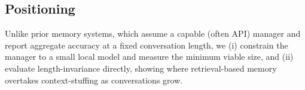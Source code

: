 \subsection{Positioning}

Unlike prior memory systems, which assume a capable (often API) manager and
report aggregate accuracy at a fixed conversation length, we (i) constrain the
manager to a small local model and measure the minimum viable size, and (ii)
evaluate length-invariance directly, showing where retrieval-based memory
overtakes context-stuffing as conversations grow.
